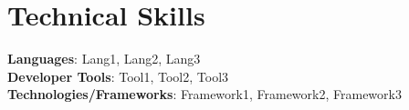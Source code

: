 \documentclass[letterpaper,11pt]{article}
\newcommand{\resumeSubHeadingListStart}{\begin{itemize}[leftmargin=0.0in, label={}]}
\newcommand{\resumeSubHeadingListEnd}{\end{itemize}}
\begin{document}
\section{Technical Skills}
 \begin{itemize}[leftmargin=0.15in, label={}]
    \small{\item{
     \textbf{Languages}{: Lang1, Lang2, Lang3} \\
     \textbf{Developer Tools}{: Tool1, Tool2, Tool3} \\
     \textbf{Technologies/Frameworks}{: Framework1, Framework2, Framework3} \\
    }}
 \end{itemize}
\end{document}
